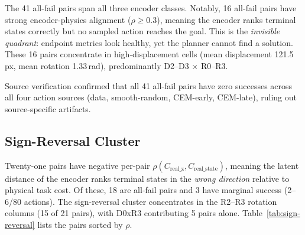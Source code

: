 The 41 all-fail pairs span all three encoder classes.  Notably, 16 all-fail
pairs have strong encoder-physics alignment ($\rho \ge 0.3$), meaning the
encoder ranks terminal states correctly but no sampled action reaches the
goal.  This is the \emph{invisible quadrant}: endpoint metrics look healthy,
yet the planner cannot find a solution.  These 16 pairs concentrate in
high-displacement cells (mean displacement 121.5\,px, mean rotation
1.33\,rad), predominantly D2--D3 $\times$ R0--R3.

Source verification confirmed that all 41 all-fail pairs have zero successes
across all four action sources (data, smooth-random, CEM-early, CEM-late),
ruling out source-specific artifacts.

\subsection{Sign-Reversal Cluster}
\label{app:sign_reversal}

Twenty-one pairs have negative per-pair $\rho(C_\text{real\_z},
C_\text{real\_state})$, meaning the latent distance of the encoder ranks terminal
states in the \emph{wrong direction} relative to physical task cost.  Of
these, 18 are all-fail pairs and 3 have marginal success (2--6/80 actions).
The sign-reversal cluster concentrates in the R2--R3 rotation columns (15 of
21 pairs), with D0xR3 contributing 5 pairs alone.
Table~\ref{tab:sign-reversal} lists the pairs sorted by $\rho$.

